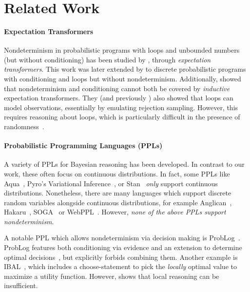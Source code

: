 
\section{Related Work}\label{sec:related_work}
 
 
\paragraph{Expectation Transformers}
Nondeterminism in probabilistic programs with loops and unbounded numbers (but without conditioning) has been studied by \citet{mciver2005abstraction}, through \textit{expectation transformers}.
This work was later extended by \citet{olmedo2018conditioning} to discrete probabilistic programs with conditioning and loops but without nondeterminism.
Additionally,  \citet{olmedo2018conditioning}  showed that nondeterminism and conditioning cannot both be covered by \emph{inductive} expectation transformers.
They (and previously \citet{shoup2009computational}) also showed that loops can model observations, essentially by emulating rejection sampling.
However, this requires reasoning about loops, which is particularly difficult in the presence of randomness~\cite{DBLP:journals/acta/KaminskiKM19}.

\paragraph{Probabilistic Programming Languages \textnormal{(PPLs)}}
A variety of PPLs for Bayesian reasoning has been developed.
In contrast to our work, these often focus on continuous distributions.
In fact, some PPLs like Aqua~\cite{huang2021aqua}, Pyro's Variational Inference~\cite{bingham2019pyro}, or Stan~\cite{carpenter2017stan} \emph{only} support continuous distributions.
Nonetheless, there are many languages which support discrete random variables alongside continuous distributions, for example Anglican~\cite{wood-aistats-2014}, Hakaru~\cite{narayanan2016probabilistic}, SOGA~\cite{randone2024inference} or WebPPL~\cite{dippl}.
However, \emph{none of the above PPLs support nondeterminism}.

A notable PPL which allows nondeterminism via decision making is ProbLog~\cite{fierens2015inference}. 
ProbLog features both conditioning via evidence and an extension to determine optimal decisions~\cite{van2010dtproblog}, but explicitly forbids combining them.
Another example is IBAL~\cite{pfeffer2007design}, which includes a choose-statement to pick the \textit{locally} optimal value to maximize a utility function.
However,  shows that local reasoning can be insufficient. 

